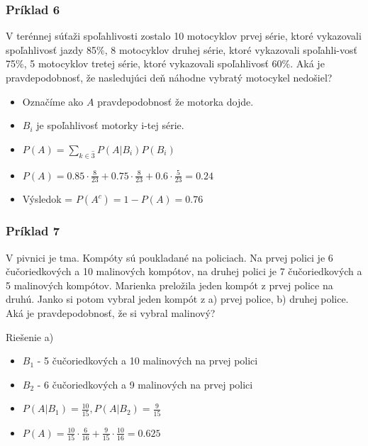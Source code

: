 \documentclass{beamer}
\begin{document}
\begin{frame}
\frametitle{Príklad 6}
V terénnej súťaži spoľahlivosti zostalo 10 motocyklov prvej série, ktoré vykazovali spoľahlivosť jazdy 85\%, 8 motocyklov druhej série, ktoré vykazovali spoľahli-vosť 75\%, 5 motocyklov tretej série, ktoré vykazovali spoľahlivosť 60\%. Aká je pravdepodobnosť, že nasledujúci deň náhodne vybratý motocykel nedošiel?

\begin{itemize}
\item<2-> Označíme ako $A$ pravdepodobnosť že motorka dojde.\\
\item<3-> $B_i$ je spoľahlivosť motorky i-tej série.
\item<4-> $P(A) = \sum_{k \in \hat{3}} P(A|B_i)P(B_i)$
\item<5-> $P(A) = 0.85 \cdot \frac{8}{23} + 0.75 \cdot \frac{8}{23} + 0.6 \cdot \frac{5}{23} = 0.24$ 
\item<6-> Výsledok = $P(A^c) = 1 - P(A) = 0.76$
\end{itemize}
\end{frame}



\begin{frame}
\frametitle{Príklad 7}
V pivnici je tma. Kompóty sú poukladané na policiach. Na prvej polici je 6 čučoriedkových a 10 malinových kompótov, na druhej polici je 7 čučoriedkových a 5 malinových kompótov. Marienka preložila jeden kompót z prvej police na druhú. Janko si potom vybral jeden kompót z a) prvej police, b) druhej police. Aká je pravdepodobnosť, že si vybral malinový?

Riešenie a)
\begin{itemize}
\item<2-> $B_1$ - 5 čučoriedkových a 10 malinových na prvej polici\\
\item<2-> $B_2$ - 6 čučoriedkových a 9 malinových na prvej polici\\
\item<3-> $P(A|B_1) = \frac{10}{15}, P(A|B_2) = \frac{9}{15}$
\item<4-> $P(A) = \frac{10}{15} \cdot \frac{6}{16} +  \frac{9}{15} \cdot \frac{10}{16} = 0.625$ 
\end{itemize}
\end{frame}
\end{document}
